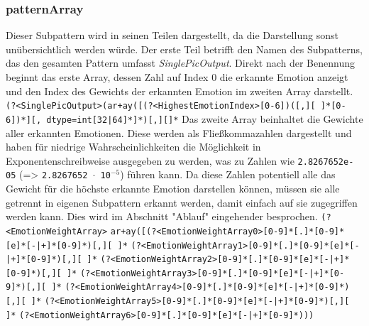 \documentclass[10pt,a4paper]{report}
\begin{document}
\subsubsection{patternArray}
Dieser Subpattern wird in seinen Teilen dargestellt, da die Darstellung sonst unübersichtlich werden würde. Der erste Teil betrifft den Namen des Subpatterns, das den gesamten Pattern umfasst \textit{SinglePicOutput}. Direkt nach der Benennung beginnt das erste Array, dessen Zahl auf Index 0 die erkannte Emotion anzeigt und den Index des Gewichts der erkannten Emotion im zweiten Array darstellt.
\newline
\texttt{(?<SinglePicOutput>(ar+ay([(?<HighestEmotionIndex>[0-6])([,][ ]*[0-6])*][, dtype=int[32|64]*]*)[,][]*}
Das zweite Array beinhaltet die Gewichte aller erkannten Emotionen. Diese werden als Fließkommazahlen dargestellt und haben für niedrige Wahrscheinlichkeiten die Möglichkeit in Exponentenschreibweise ausgegeben zu werden, was zu  Zahlen wie \texttt{2.8267652e-05} (=> \texttt{2.8267652 $\cdot$ 10$^{-5}$}) führen kann. Da diese Zahlen potentiell alle das Gewicht für die höchste erkannte Emotion darstellen können, müssen sie alle getrennt in eigenen Subpattern erkannt werden, damit einfach auf sie zugegriffen werden kann. Dies wird im Abschnitt "Ablauf" eingehender besprochen. 
 \newline
\texttt{(?<EmotionWeightArray>}
\texttt{ar+ay([(?<EmotionWeightArray0>[0-9]*[.]*[0-9]*[e]*[-|+]*[0-9]*)[,][ ]*}\newline
\texttt{(?<EmotionWeightArray1>[0-9]*[.]*[0-9]*[e]*[-|+]*[0-9]*)[,][ ]*}
\texttt{(?<EmotionWeightArray2>[0-9]*[.]*[0-9]*[e]*[-|+]*[0-9]*)[,][ ]*}
\texttt{(?<EmotionWeightArray3>[0-9]*[.]*[0-9]*[e]*[-|+]*[0-9]*)[,][ ]*}\newline
\texttt{(?<EmotionWeightArray4>[0-9]*[.]*[0-9]*[e]*[-|+]*[0-9]*)[,][ ]*}
\texttt{(?<EmotionWeightArray5>[0-9]*[.]*[0-9]*[e]*[-|+]*[0-9]*)[,][ ]*}
\texttt{(?<EmotionWeightArray6>[0-9]*[.]*[0-9]*[e]*[-|+]*[0-9]*)))}\newline
\end{document}
